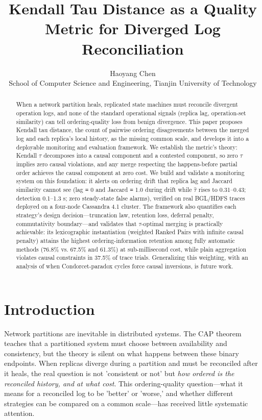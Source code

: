 \documentclass[10pt,twocolumn]{article}
\title{Kendall Tau Distance as a Quality Metric for Diverged Log Reconciliation}
\author{Haoyang Chen\\ School of Computer Science and Engineering, Tianjin University of Technology}
\date{}
\begin{document}
\maketitle

\begin{abstract}
When a network partition heals, replicated state machines must reconcile divergent operation logs, and none of the standard operational signals (replica lag, operation-set similarity) can tell ordering-quality loss from benign divergence. This paper proposes Kendall tau distance, the count of pairwise ordering disagreements between the merged log and each replica's local history, as the missing common scale, and develops it into a deployable monitoring and evaluation framework. We establish the metric's theory: Kendall $\tau$ decomposes into a causal component and a contested component, so zero $\tau$ implies zero causal violations, and any merge respecting the happens-before partial order achieves the causal component at zero cost. We build and validate a monitoring system on this foundation: it alerts on ordering drift that replica lag and Jaccard similarity cannot see (lag ≡ 0 and Jaccard ≡ 1.0 during drift while $\hat{\tau}$ rises to 0.31–0.43; detection 0.1–1.3 s; zero steady-state false alarms), verified on real BGL/HDFS traces deployed on a four-node Cassandra 4.1 cluster. The framework also quantifies each strategy's design decision—truncation law, retention loss, deferral penalty, commutativity boundary—and validates that $\tau$-optimal merging is practically achievable: its lexicographic instantiation (weighted Ranked Pairs with infinite causal penalty) attains the highest ordering-information retention among fully automatic methods (76.8\% vs. 67.5\% and 61.3\%) at sub-millisecond cost, while plain aggregation violates causal constraints in 37.5\% of trace trials. Generalizing this weighting, with an analysis of when Condorcet-paradox cycles force causal inversions, is future work.
\end{abstract}

\section{Introduction}
Network partitions are inevitable in distributed systems. The CAP theorem teaches that a partitioned system must choose between availability and consistency, but the theory is silent on what happens between these binary endpoints. When replicas diverge during a partition and must be reconciled after it heals, the real question is not 'consistent or not' but \emph{how ordered is the reconciled history, and at what cost}. This ordering-quality question—what it means for a reconciled log to be 'better' or 'worse,' and whether different strategies can be compared on a common scale—has received little systematic attention.
\end{document}
